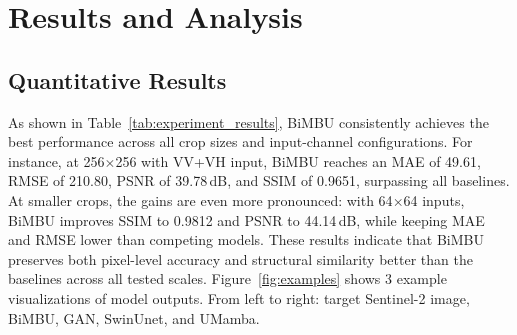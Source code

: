 \section{Results and Analysis}

\subsection{Quantitative Results}

As shown in Table~\ref{tab:experiment_results}, BiMBU consistently achieves the best performance across all crop sizes and input-channel configurations. For instance, at 256$\times$256 with VV+VH input, BiMBU reaches an MAE of 49.61, RMSE of 210.80, PSNR of 39.78\,dB, and SSIM of 0.9651, surpassing all baselines. At smaller crops, the gains are even more pronounced: with 64$\times$64 inputs, BiMBU improves SSIM to 0.9812 and PSNR to 44.14\,dB, while keeping MAE and RMSE lower than competing models. These results indicate that BiMBU preserves both pixel-level accuracy and structural similarity better than the baselines across all tested scales. Figure~\ref{fig:examples} shows 3 example visualizations of model outputs. From left to right: target Sentinel-2 image, BiMBU, GAN, SwinUnet, and UMamba.


